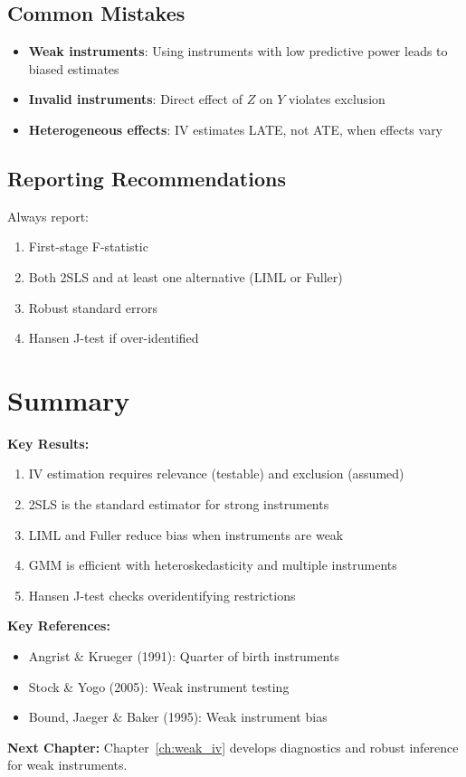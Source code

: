 \subsection{Common Mistakes}

\begin{itemize}
    \item \textbf{Weak instruments}: Using instruments with low predictive power leads to biased estimates
    \item \textbf{Invalid instruments}: Direct effect of $Z$ on $Y$ violates exclusion
    \item \textbf{Heterogeneous effects}: IV estimates LATE, not ATE, when effects vary
\end{itemize}

\subsection{Reporting Recommendations}

Always report:
\begin{enumerate}
    \item First-stage F-statistic
    \item Both 2SLS and at least one alternative (LIML or Fuller)
    \item Robust standard errors
    \item Hansen J-test if over-identified
\end{enumerate}


\section{Summary}
\label{sec:iv_summary}

\textbf{Key Results:}
\begin{enumerate}
    \item IV estimation requires relevance (testable) and exclusion (assumed)
    \item 2SLS is the standard estimator for strong instruments
    \item LIML and Fuller reduce bias when instruments are weak
    \item GMM is efficient with heteroskedasticity and multiple instruments
    \item Hansen J-test checks overidentifying restrictions
\end{enumerate}

\textbf{Key References:}
\begin{itemize}
    \item Angrist \& Krueger (1991): Quarter of birth instruments
    \item Stock \& Yogo (2005): Weak instrument testing
    \item Bound, Jaeger \& Baker (1995): Weak instrument bias
\end{itemize}

\textbf{Next Chapter:} Chapter~\ref{ch:weak_iv} develops diagnostics and robust inference for weak instruments.
